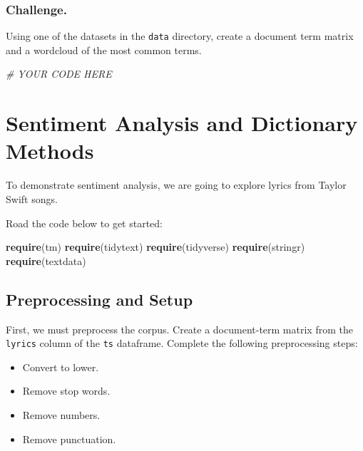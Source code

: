 \documentclass[
]{book}
\newenvironment{Shaded}{\begin{snugshade}}{\end{snugshade}}
\newcommand{\CommentTok}[1]{\textcolor[rgb]{0.56,0.35,0.01}{\textit{#1}}}
\newcommand{\KeywordTok}[1]{\textcolor[rgb]{0.13,0.29,0.53}{\textbf{#1}}}
\newcommand{\NormalTok}[1]{#1}
\providecommand{\tightlist}{%
  \setlength{\itemsep}{0pt}\setlength{\parskip}{0pt}}
\begin{document}
\hypertarget{challenge.-1}{%
\subsubsection{Challenge.}\label{challenge.-1}}

Using one of the datasets in the \texttt{data} directory, create a document term matrix and a wordcloud of the most common terms.

\begin{Shaded}
\begin{Highlighting}[]
\CommentTok{# YOUR CODE HERE}
\end{Highlighting}
\end{Shaded}

\hypertarget{sentiment-analysis-and-dictionary-methods}{%
\section{Sentiment Analysis and Dictionary Methods}\label{sentiment-analysis-and-dictionary-methods}}

To demonstrate sentiment analysis, we are going to explore lyrics from Taylor Swift songs.

Road the code below to get started:

\begin{Shaded}
\begin{Highlighting}[]
\KeywordTok{require}\NormalTok{(tm)}
\KeywordTok{require}\NormalTok{(tidytext)}
\KeywordTok{require}\NormalTok{(tidyverse)}
\KeywordTok{require}\NormalTok{(stringr)}
\KeywordTok{require}\NormalTok{(textdata)}
\end{Highlighting}
\end{Shaded}

\hypertarget{preprocessing-and-setup}{%
\subsection{Preprocessing and Setup}\label{preprocessing-and-setup}}

First, we must preprocess the corpus. Create a document-term matrix from the \texttt{lyrics} column of the \texttt{ts} dataframe. Complete the following preprocessing steps:

\begin{itemize}
\tightlist
\item
  Convert to lower.
\item
  Remove stop words.
\item
  Remove numbers.
\item
  Remove punctuation.
\end{itemize}
\end{document}
